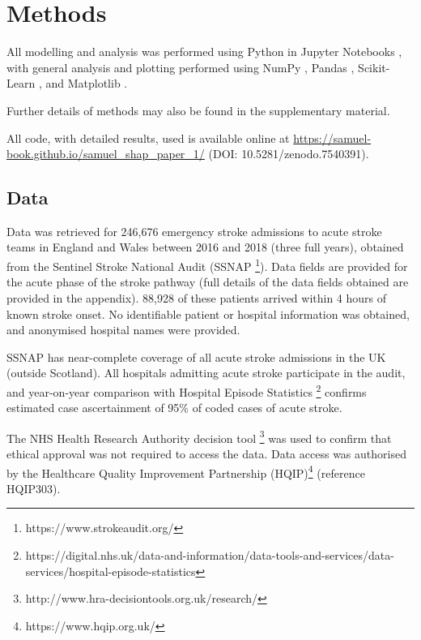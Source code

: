 \renewcommand{\thefootnote}{\alph{footnote}} %

\section{Methods}

All modelling and analysis was performed using Python in Jupyter Notebooks \cite{kluyver_jupyter_2016}, with general analysis and plotting performed using NumPy \cite{harris_array_2020}, Pandas \cite{mckinney-proc-scipy-2010}, Scikit-Learn  \cite{pedregosa_scikit-learn_2011}, and Matplotlib \cite{hunter_matplotlib_2007}. 

Further details of methods may also be found in the supplementary material. 

All code, with detailed results, used is available online at \url{https://samuel-book.github.io/samuel_shap_paper_1/} (DOI: 10.5281/zenodo.7540391). 

\subsection{Data}

Data was retrieved for 246,676 emergency stroke admissions to  acute stroke teams in England and Wales between 2016 and 2018 (three full years), obtained from the Sentinel Stroke National Audit (SSNAP \footnote{https://www.strokeaudit.org/}). Data fields are provided for the acute phase of the stroke pathway (full details of the data fields obtained are provided in the appendix). 88,928 of these patients arrived within 4 hours of known stroke onset. No identifiable patient or hospital information was obtained, and anonymised hospital names were provided.

 SSNAP has near-complete coverage of all acute stroke admissions in the UK (outside Scotland). All hospitals admitting acute stroke participate in the audit, and year-on-year comparison with Hospital Episode Statistics \footnote{https://digital.nhs.uk/data-and-information/data-tools-and-services/data-services/hospital-episode-statistics} confirms estimated case ascertainment of 95\% of coded cases of acute stroke.

The NHS Health Research Authority decision tool \footnote{http://www.hra-decisiontools.org.uk/research/} was used to confirm that ethical approval was not required to access the data. Data access was authorised by the Healthcare Quality Improvement Partnership (HQIP)\footnote{https://www.hqip.org.uk/} (reference HQIP303). 

